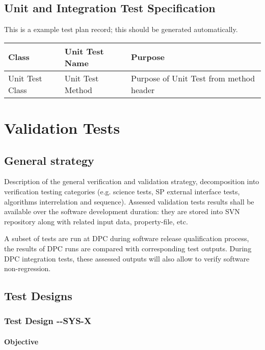 \subsection{Unit and Integration Test Specification}

This is a example test plan record; this should be generated automatically.

\begin{longtable} {|p{}|p{}|p{}|}\hline
{\bf Class} & {\bf Unit Test Name} & {\bf Purpose}  \\\hline
Unit Test Class & 
Unit Test Method & 
Purpose of Unit Test from method header \\\hline
\end{longtable}

\section{Validation Tests}

\subsection{General strategy}

Description of the general verification and validation strategy, decomposition into verification testing categories (e.g. science tests, SP external interface tests, algorithms interrelation and sequence). Assessed validation tests results shall be available over the software development duration: they are stored into SVN repository along with related input data, property-file, etc.

A subset of tests are run at DPC during software release qualification process, the results of DPC runs are compared with corresponding test outputs. During DPC integration tests, these assessed outputs will also allow to verify software non-regression.
 
\subsection{Test Designs}

\subsubsection{Test Design \CU-\product-SYS-X}

\paragraph{Objective}

